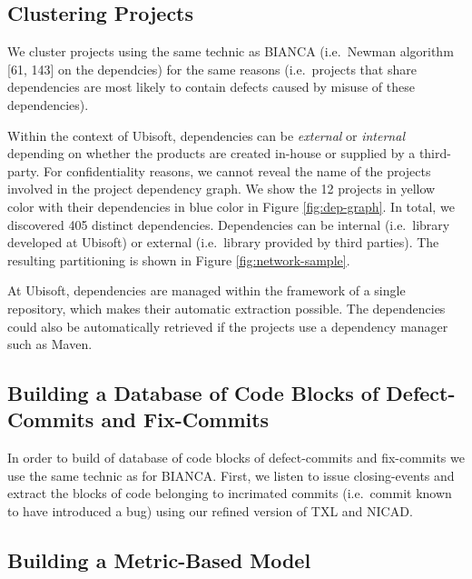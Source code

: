 \documentclass[12pt]{report}
\begin{document}
\subsection{Clustering Projects}\label{sec:clustering}

We cluster projects using the same technic as BIANCA (i.e.~Newman
algorithm {[}61, 143{]} on the dependcies) for the same reasons
(i.e.~projects that share dependencies are most likely to contain
defects caused by misuse of these dependencies).

Within the context of Ubisoft, dependencies can be \emph{external} or
\emph{internal} depending on whether the products are created in-house
or supplied by a third-party. For confidentiality reasons, we cannot
reveal the name of the projects involved in the project dependency
graph. We show the 12 projects in yellow color with their dependencies
in blue color in Figure \ref{fig:dep-graph}. In total, we discovered 405
distinct dependencies. Dependencies can be internal (i.e.~library
developed at Ubisoft) or external (i.e.~library provided by third
parties). The resulting partitioning is shown in Figure
\ref{fig:network-sample}.



At Ubisoft, dependencies are managed within the framework of a single
repository, which makes their automatic extraction possible. The
dependencies could also be automatically retrieved if the projects use a
dependency manager such as Maven.



\subsection{Building a Database of Code Blocks of Defect-Commits and
Fix-Commits}\label{sec:offline}

In order to build of database of code blocks of defect-commits and
fix-commits we use the same technic as for BIANCA. First, we listen to
issue closing-events and extract the blocks of code belonging to
incrimated commits (i.e.~commit known to have introduced a bug) using
our refined version of TXL and NICAD.

\subsection{Building a Metric-Based Model}\label{sec:metric-based}
\end{document}
